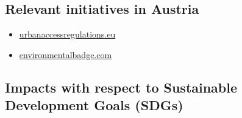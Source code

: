 \documentclass[
]{book}
\providecommand{\tightlist}{%
  \setlength{\itemsep}{0pt}\setlength{\parskip}{0pt}}
\begin{document}
\hypertarget{relevant-initiatives-in-austria-3}{%
\subsection*{Relevant initiatives in Austria}\label{relevant-initiatives-in-austria-3}}

\begin{itemize}
\tightlist
\item
  \href{https://urbanaccessregulations.eu/countries-mainmenu-147/austria-mainmenu-78/wien-vienna}{urbanaccessregulations.eu}
\item
  \href{https://www.environmentalbadge.com/environmental-zone-vienna/}{environmentalbadge.com}
\end{itemize}

\hypertarget{impacts-with-respect-to-sustainable-development-goals-sdgs-3}{%
\subsection*{Impacts with respect to Sustainable Development Goals (SDGs)}\label{impacts-with-respect-to-sustainable-development-goals-sdgs-3}}
\end{document}
